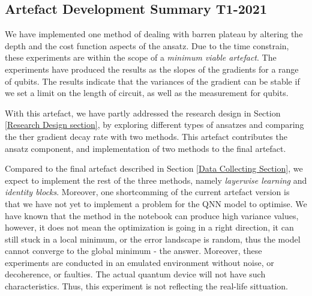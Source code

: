 \subsection{Artefact Development Summary T1-2021}
We have implemented one method of dealing with barren plateau by altering the depth and the cost function aspects of the ansatz.
Due to the time constrain, these experiments are within the scope of a \textit{minimum viable artefact}.
The experiments have produced the results as the slopes of the gradients for a range of qubits.
The results indicate that the variances of the gradient can be stable if we set a limit on the length of circuit, as well as the measurement for qubits.

With this artefact, we have partly addressed the research design in Section \ref{Research Design section}, by exploring different types of ansatzes and comparing the ther gradient decay rate with two methods.
This artefact contributes the ansatz component, and implementation of two methods to the final artefact.

Compared to the final artefact described in Section \ref{Data Collecting Section}, we expect to implement the rest of the three methods, namely \textit{layerwise learning} and \textit{identity blocks}.
Moreover, one shortcomming of the current artefact version is that we have not yet to implement a problem for the QNN model to optimise.
We have known that the method in the notebook can produce high variance values, however, it does not mean the optimization is going in a right direction, it can still stuck in a local minimum, or the error landscape is random, thus the model cannot converge to the global minimum - the answer.
Moreover, these experiments are conducted in an emulated environment without noise, or decoherence, or faulties.
The actual quantum device will not have such characteristics.
Thus, this experiment is not reflecting the real-life sittuation.